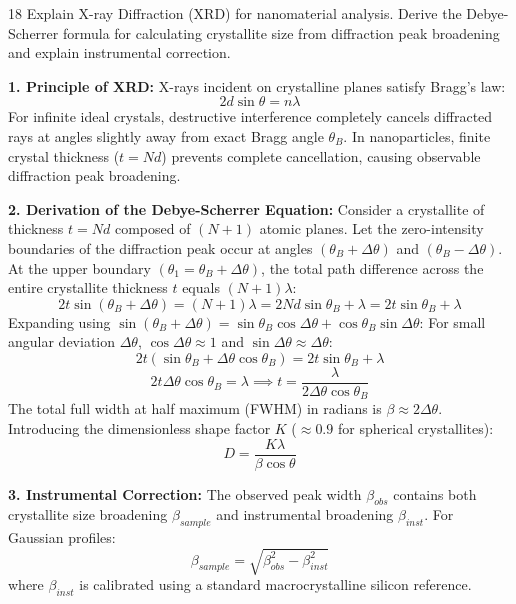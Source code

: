 \begin{theoryq}{18}
Explain X-ray Diffraction (XRD) for nanomaterial analysis. Derive the Debye-Scherrer formula for calculating crystallite size from diffraction peak broadening and explain instrumental correction.
\end{theoryq}
\begin{theorysol}
\textbf{1. Principle of XRD:}
X-rays incident on crystalline planes satisfy Bragg's law:
\begin{equation}
2d \sin\theta = n\lambda
\end{equation}
For infinite ideal crystals, destructive interference completely cancels diffracted rays at angles slightly away from exact Bragg angle $\theta_B$. In nanoparticles, finite crystal thickness ($t = N d$) prevents complete cancellation, causing observable diffraction peak broadening.

\textbf{2. Derivation of the Debye-Scherrer Equation:}
Consider a crystallite of thickness $t = N d$ composed of $(N+1)$ atomic planes.
Let the zero-intensity boundaries of the diffraction peak occur at angles $(\theta_B + \Delta\theta)$ and $(\theta_B - \Delta\theta)$.
At the upper boundary $(\theta_1 = \theta_B + \Delta\theta)$, the total path difference across the entire crystallite thickness $t$ equals $(N+1)\lambda$:
\begin{equation}
2 t \sin(\theta_B + \Delta\theta) = (N+1)\lambda = 2Nd \sin\theta_B + \lambda = 2t \sin\theta_B + \lambda
\end{equation}
Expanding using $\sin(\theta_B + \Delta\theta) = \sin\theta_B \cos\Delta\theta + \cos\theta_B \sin\Delta\theta$:
For small angular deviation $\Delta\theta$, $\cos\Delta\theta \approx 1$ and $\sin\Delta\theta \approx \Delta\theta$:
\begin{equation}
2 t (\sin\theta_B + \Delta\theta \cos\theta_B) = 2t \sin\theta_B + \lambda
\end{equation}
\begin{equation}
2 t \Delta\theta \cos\theta_B = \lambda \implies t = \frac{\lambda}{2\Delta\theta \cos\theta_B}
\end{equation}
The total full width at half maximum (FWHM) in radians is $\beta \approx 2\Delta\theta$.
Introducing the dimensionless shape factor $K$ ($\approx 0.9$ for spherical crystallites):
\begin{equation}
D = \frac{K \lambda}{\beta \cos\theta}
\end{equation}

\textbf{3. Instrumental Correction:}
The observed peak width $\beta_{obs}$ contains both crystallite size broadening $\beta_{sample}$ and instrumental broadening $\beta_{inst}$. For Gaussian profiles:
\begin{equation}
\beta_{sample} = \sqrt{\beta_{obs}^2 - \beta_{inst}^2}
\end{equation}
where $\beta_{inst}$ is calibrated using a standard macrocrystalline silicon reference.
\end{theorysol}
\vspace{4mm}


